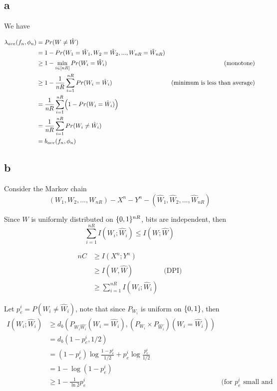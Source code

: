 \documentclass{article}
\begin{document}
\subsection{a}

We have

\begin{align*}
    \lambda_{ave} (f_n, \phi_n)
    &= Pr(W \neq \hat{W}) \\
    &= 1 - Pr(W_1 = \hat{W}_1, W_2 = \hat{W}_2, ..., W_{nR} = \hat{W}_{nR}) \\
    &\geq 1 - \min_{i \in [nR]} Pr(W_i = \hat{W}_i) &\text{(monotone)}\\
    &\geq 1 - \frac{1}{nR} \sum_{i=1}^{nR} Pr(W_i = \hat{W}_i) &\text{(minimum is less than average)}\\
    &= \frac{1}{nR} \sum_{i=1}^{nR} \tuple*{1 - Pr(W_i = \hat{W}_i)} \\
    &= \frac{1}{nR} \sum_{i=1}^{nR} Pr(W_i \neq \hat{W}_i) \\
    &= b_{ave}(f_n, \phi_n)
\end{align*}

\subsection{b}

Consider the Markov chain
$$
    (W_1, W_2, ..., W_{nR}) - X^n - Y^n - (\hat{W}_1, \hat{W}_2, ..., \hat{W}_{nR})
$$

Since $W$ is uniformly distributed on $\{0, 1\}^{nR}$, bits are independent, then
$$
    \sum_{i=1}^{nR} I(W_i; \hat{W}_i) \leq I(W; \hat{W})
$$

\begin{align*}
    nC
    &\geq I(X^n; Y^n) \\
    &\geq I(W, \hat{W}) &\text{(DPI)}\\
    &\geq \sum_{i=1}^{nR} I(W_i; \hat{W}_i)
\end{align*}

Let $p_e^i = P(W_i \neq \hat{W}_i)$, note that since $P_{W_i}$ is uniform on $\{0, 1\}$, then
\begin{align*}
    I(W_i; \hat{W}_i)
    &\geq d_b(P_{W_i \hat{W_i}} (W_i = \hat{W}_i), (P_{W_i} \times P_{\hat{W_i}})(W_i = \hat{W}_i)) \\
    &= d_b(1 - p_e^i, 1/2) \\
    &= (1 - p_e^i) \log \frac{1 - p_e^i}{1/2} + p_e^i \log \frac{p_e^i}{1/2} \\
    &= 1 - \log (1 - p_e^i) \\
    &\geq 1 - \frac{1}{\ln 2} p_e^i &\text{(for $p_e^i$ small and positive)}\\
\end{align*}
\end{document}
